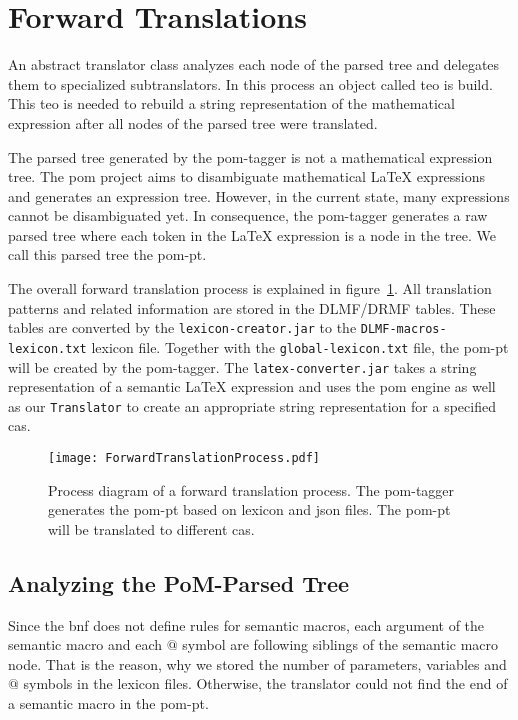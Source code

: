 \section{Forward Translations}\label{sec:forward-translation}
An abstract translator class analyzes each node of the parsed tree and delegates them to specialized subtranslators. In this process an object called \gls*{teo} is build. This \gls*{teo} is needed to rebuild a string representation of the mathematical expression after all nodes of the parsed tree were translated.

The parsed tree generated by the \gls*{pom}-tagger is not a mathematical expression tree. The \gls*{pom} project aims to disambiguate mathematical \LaTeX{} expressions and generates an expression tree. However, in the current state, many expressions cannot be disambiguated yet. In consequence, the \gls*{pom}-tagger generates a raw parsed tree where each token in the \LaTeX{} expression is a node in the tree. We call this parsed tree the \gls*{pom-pt}.

The overall forward translation process is explained in figure~\ref{fig:forward-trans}. All translation patterns and related information are stored in the DLMF/DRMF tables. These tables are converted by the \verb|lexicon-creator.jar| to the \verb|DLMF-macros-lexicon.txt| lexicon file. Together with the \verb|global-lexicon.txt| file, the \gls*{pom-pt} will be created by the \gls*{pom}-tagger. The \verb|latex-converter.jar| takes a string representation of a semantic \LaTeX{} expression and uses the \gls*{pom} engine as well as our \verb|Translator| to create an appropriate string representation for a specified \gls*{cas}.

\begin{figure}[ht]
	\vspace{-10pt}
	\centering
	\texttt{[image: ForwardTranslationProcess.pdf]}
	\caption{Process diagram of a forward translation process. The \gls*{pom}-tagger generates the \gls*{pom-pt} based on lexicon and \gls*{json} files. The \gls*{pom-pt} will be translated to different \gls*{cas}.}
	\label{fig:forward-trans}
	\vspace{-10pt}
\end{figure}

\subsection{Analyzing the PoM-Parsed Tree}\label{subsec:analyze-mlp}
Since the \gls*{bnf} does not define rules for semantic macros, each argument of the semantic macro and each $@$ symbol are following siblings of the semantic macro node. That is the reason, why we stored the number of parameters, variables and $@$ symbols in the lexicon files. Otherwise, the translator could not find the end of a semantic macro in the \gls*{pom-pt}.

